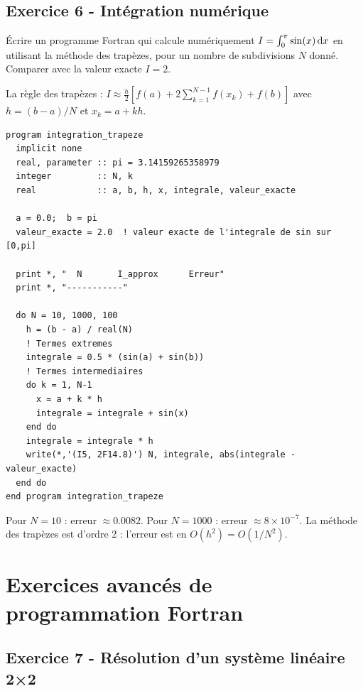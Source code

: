 \documentclass[12pt,a4paper]{article}
\begin{document}
\subsection*{Exercice 6 - Intégration numérique \niveau{\difficile}}

\begin{boiteexercice}
Écrire un programme Fortran qui calcule numériquement $I = \int_0^\pi \sin(x)\,\mathrm{d} x$ en utilisant la méthode des trapèzes, pour un nombre de subdivisions $N$ donné. Comparer avec la valeur exacte $I=2$.

La règle des trapèzes : $I \approx \frac{h}{2}\left[f(a) + 2\sum_{k=1}^{N-1}f(x_k) + f(b)\right]$ avec $h=(b-a)/N$ et $x_k=a+kh$.
\end{boiteexercice}

\begin{boitecorrige}
\begin{lstlisting}
program integration_trapeze
  implicit none
  real, parameter :: pi = 3.14159265358979
  integer         :: N, k
  real            :: a, b, h, x, integrale, valeur_exacte

  a = 0.0;  b = pi
  valeur_exacte = 2.0  ! valeur exacte de l'integrale de sin sur [0,pi]

  print *, "  N       I_approx      Erreur"
  print *, "-----------"

  do N = 10, 1000, 100
    h = (b - a) / real(N)
    ! Termes extremes
    integrale = 0.5 * (sin(a) + sin(b))
    ! Termes intermediaires
    do k = 1, N-1
      x = a + k * h
      integrale = integrale + sin(x)
    end do
    integrale = integrale * h
    write(*,'(I5, 2F14.8)') N, integrale, abs(integrale - valeur_exacte)
  end do
end program integration_trapeze
\end{lstlisting}

Pour $N=10$ : erreur $\approx 0.0082$. Pour $N=1000$ : erreur $\approx 8\times10^{-7}$. La méthode des trapèzes est d'ordre 2 : l'erreur est en $O(h^2) = O(1/N^2)$.
\end{boitecorrige}


\newpage
\section{Exercices avancés de programmation Fortran}

\subsection*{Exercice 7 - Résolution d'un système linéaire 2×2 \niveau{\facile}}
\end{document}
